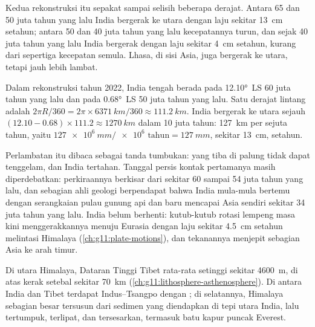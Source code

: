 Kedua rekonstruksi itu sepakat sampai selisih beberapa derajat. Antara 65 dan
50 juta tahun yang lalu India bergerak ke utara dengan laju sekitar
\qty{13}{cm} setahun; antara 50 dan 40 juta tahun yang lalu kecepatannya
turun, dan
sejak 40 juta tahun yang lalu India bergerak dengan laju sekitar \qty{4}{cm}
setahun, kurang dari sepertiga kecepatan semula. Lhasa, di sisi Asia, juga
bergerak ke utara, tetapi jauh lebih lambat.

\begin{example}\label{ex:g12:mountain-building:india}
Dalam rekonstruksi tahun 2022, India tengah berada pada \ang{12.10}~LS 60 juta
tahun yang lalu dan pada \ang{0.68}~LS 50 juta tahun yang lalu. Satu derajat
lintang adalah
$2\pi R/360 = 2\pi \times \qty{6371}{km}/360 \approx \qty{111.2}{km}$. India
bergerak ke utara sejauh $(12.10 - 0.68) \times 111.2 \approx \qty{1270}{km}$
dalam 10 juta tahun: \qty{127}{km} per sejuta tahun, yaitu $\qty{127e6}{mm} /
\num{e6}\text{ tahun} = \qty{127}{mm}$, sekitar \qty{13}{cm}, setahun.
\end{example}

Perlambatan itu dibaca sebagai tanda tumbukan:  yang tiba di palung
tidak dapat tenggelam, dan India tertahan. Tanggal persis kontak pertamanya
masih diperdebatkan: perkiraannya berkisar dari sekitar 60 sampai 54 juta tahun
yang lalu, dan sebagian ahli geologi berpendapat bahwa India mula-mula bertemu
dengan serangkaian pulau gunung api dan baru mencapai Asia sendiri sekitar 34
juta tahun yang lalu. India belum berhenti: kutub-kutub rotasi lempeng masa
kini menggerakkannya menuju Eurasia dengan laju sekitar \qty{4.5}{cm} setahun
melintasi Himalaya (\cref{ch:g11:plate-motions}), dan tekanannya menjepit
sebagian Asia ke arah timur.

Di utara Himalaya, Dataran Tinggi Tibet rata-rata setinggi sekitar
\qty{4600}{m}, di atas kerak setebal sekitar \qty{70}{km}
(\cref{ch:g11:lithosphere-asthenosphere}). Di antara India dan Tibet terdapat
 Indus--Tsangpo dengan ; di selatannya, Himalaya
sebagian besar tersusun dari sedimen yang diendapkan di tepi utara India, lalu
tertumpuk, terlipat, dan tersesarkan, termasuk batu kapur puncak Everest.

